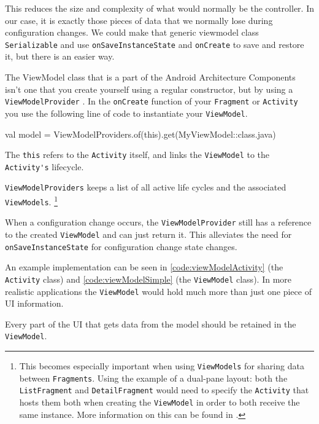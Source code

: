 This reduces the size and complexity of what would normally be the controller.
In our case, it is exactly those pieces of data that we normally lose during configuration changes.
We could make that generic viewmodel class \lstinline!Serializable! and use \lstinline!onSaveInstanceState! and \lstinline!onCreate! to save and restore it, but there is an easier way. 

The ViewModel class that is a part of the Android Architecture Components isn't one that you create yourself using a regular constructor, but by using a \lstinline!ViewModelProvider! \cite{viewModelProvider}.
In the \lstinline!onCreate! function of your \lstinline!Fragment! or \lstinline!Activity! you use the following line of code to instantiate your \lstinline!ViewModel!.


\begin{android}
val model = ViewModelProviders.of(this).get(MyViewModel::class.java)	
\end{android}

The \lstinline!this! refers to the \lstinline!Activity! itself, and links the \lstinline!ViewModel! to the \lstinline!Activity's! lifecycle.

\lstinline!ViewModelProviders! keeps a list of all active life cycles and the associated \lstinline!ViewModels!.
\footnote{This becomes especially important when using \lstinline!ViewModels! for sharing data between \lstinline!Fragments!.
Using the example of a dual-pane layout: both the \lstinline!ListFragment! and \lstinline!DetailFragment! would need to specify the \lstinline!Activity! that hosts them both when creating the \lstinline!ViewModel! in order to both receive the same instance. 
More information on this can be found in \cite{shareDataBetweenFragments}.}

When a configuration change occurs, the \lstinline!ViewModelProvider! still has a reference to the created \lstinline!ViewModel! and can just return it.
This alleviates the need for \lstinline!onSaveInstanceState! for configuration change state changes. 

An example implementation can be seen in \ref{code:viewModelActivity} (the \lstinline!Activity! class) and \ref{code:viewModelSimple} (the \lstinline!ViewModel! class).
In more realistic applications the \lstinline!ViewModel! would hold much more than just one piece of UI information.

Every part of the UI that gets data from the model should be retained in the \lstinline!ViewModel!.

